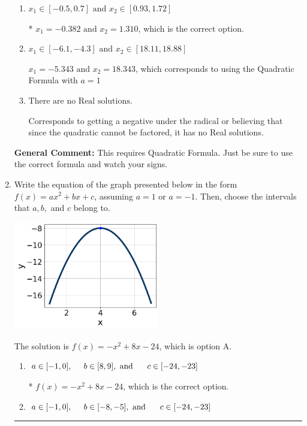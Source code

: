 \documentclass{extbook}[14pt]
\newcommand{\litem}[1]{\item #1

\rule{\textwidth}{0.4pt}}
\begin{document}
\begin{enumerate}
{\begin{enumerate}[label=\Alph*.]
 $x_1 = -23.221 \text{ and } x_2 = 24.150$, which corresponds to writing the Quadratic Formula as $-\frac{b}{2a} \pm \sqrt{b^2 - 4ac}$.
\item \( x_1 \in [-0.5, 0.7] \text{ and } x_2 \in [0.93, 1.72] \)

* $x_1 = -0.382 \text{ and } x_2 = 1.310$, which is the correct option.
\item \( x_1 \in [-6.1, -4.3] \text{ and } x_2 \in [18.11, 18.88] \)

 $x_1 = -5.343 \text{ and } x_2 = 18.343$, which corresponds to using the Quadratic Formula with $a=1$
\item \( \text{There are no Real solutions.} \)

Corresponds to getting a negative under the radical or believing that since the quadratic cannot be factored, it has no Real solutions.
\end{enumerate}

\textbf{General Comment:} This requires Quadratic Formula. Just be sure to use the correct formula and watch your signs.
}
\litem{
Write the equation of the graph presented below in the form $f(x)=ax^2+bx+c$, assuming  $a=1$ or $a=-1$. Then, choose the intervals that $a, b,$ and $c$ belong to.

\begin{center}
    \includegraphics[width=0.5\textwidth]{../Figures/quadraticGraphToEquationB.png}
\end{center}


The solution is \( f(x) = -x^{2} +8 x -24 \), which is option A.\begin{enumerate}[label=\Alph*.]
\item \( a \in [-1, 0], \hspace*{5mm} b \in [8, 9], \text{ and } \hspace*{5mm} c \in [-24, -23] \)

* $f(x)=-x^{2} +8 x -24$, which is the correct option.
\item \( a \in [-1, 0], \hspace*{5mm} b \in [-8, -5], \text{ and } \hspace*{5mm} c \in [-24, -23] \)


\end{enumerate}}
\end{enumerate}
\end{document}
